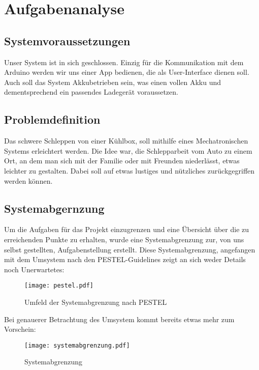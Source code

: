 \section{Aufgabenanalyse}

\subsection{Systemvoraussetzungen}
Unser System ist in sich geschlossen. Einzig für die Kommunikation mit dem Arduino werden wir uns einer App bedienen, die als User-Interface dienen soll. Auch soll das System Akkubetrieben sein, was einen vollen Akku und dementsprechend ein passendes Ladegerät voraussetzen.

\subsection{Problemdefinition}
Das schwere Schleppen von einer Kühlbox, soll mithilfe eines Mechatronischen Systems erleichtert werden. Die Idee war, die Schlepparbeit vom Auto zu einem Ort, an dem man sich mit der Familie oder mit Freunden niederlässt, etwas leichter zu gestalten. Dabei soll auf etwas lustiges und nützliches zurückgegriffen werden können.

\subsection{Systemabgernzung}
Um die Aufgaben für das Projekt einzugrenzen und eine Übersicht über die zu erreichenden Punkte zu erhalten, wurde eine Systemabgrenzung zur, von uns selbst gestellten, Aufgabenstellung erstellt. Diese Systemabgrenzung, angefangen mit dem Umsystem nach den PESTEL-Guidelines zeigt an sich weder Details noch Unerwartetes:

\begin{figure}[H]
    \begin{center}
    \texttt{[image: pestel.pdf]}
    \end{center}
    \caption{Umfeld der Systemabgrenzung nach PESTEL}
\end{figure}

Bei genauerer Betrachtung des Umsystem kommt bereits etwas mehr zum Vorschein:

\begin{figure}[H]
    \begin{center}
    \texttt{[image: systemabgrenzung.pdf]}
    \end{center}
    \caption{Systemabgrenzung}
    \label{fig:systemabgrenzung}
\end{figure}

